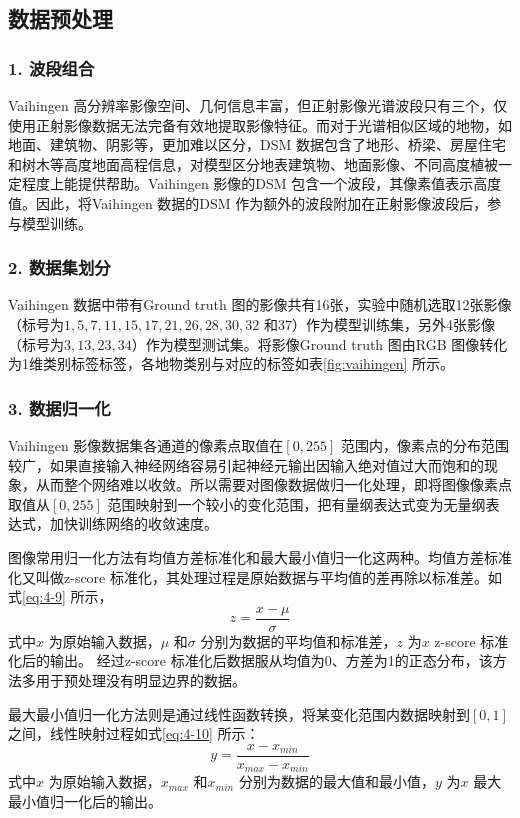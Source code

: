 \subsection{数据预处理}
\label{sec:second-2}

\subsubsection*{1. 波段组合}
Vaihingen 高分辨率影像空间、几何信息丰富，但正射影像光谱波段只有三个，仅使用正射影像数据无法完备有效地提取影像特征。而对于光谱相似区域的地物，如地面、建筑物、阴影等，更加难以区分，DSM 数据包含了地形、桥梁、房屋住宅和树木等高度地面高程信息，对模型区分地表建筑物、地面影像、不同高度植被一定程度上能提供帮助。Vaihingen 影像的DSM 包含一个波段，其像素值表示高度值。因此，将Vaihingen 数据的DSM 作为额外的波段附加在正射影像波段后，参与模型训练。

\subsubsection*{2. 数据集划分}
Vaihingen 数据中带有Ground truth 图的影像共有16张，实验中随机选取12张影像（标号为$1,5,7,11,15,17,21,26,28,30,32$ 和$37$）作为模型训练集，另外4张影像（标号为$3,13,23,34$）作为模型测试集。将影像Ground truth 图由RGB 图像转化为1维类别标签标签，各地物类别与对应的标签如表\ref{fig:vaihingen} 所示。

\subsubsection*{3. 数据归一化}
Vaihingen 影像数据集各通道的像素点取值在$[0,255]$ 范围内，像素点的分布范围较广，如果直接输入神经网络容易引起神经元输出因输入绝对值过大而饱和的现象，从而整个网络难以收敛。所以需要对图像数据做归一化处理，即将图像像素点取值从$[0,255]$ 范围映射到一个较小的变化范围，把有量纲表达式变为无量纲表达式，加快训练网络的收敛速度。

图像常用归一化方法有均值方差标准化和最大最小值归一化这两种。均值方差标准化又叫做z-score 标准化，其处理过程是原始数据与平均值的差再除以标准差。如式\ref{eq:4-9} 所示，
\begin{equation}
  \label{eq:4-9}
  z = \frac{x-\mu}{\sigma}
\end{equation}
式中$x$ 为原始输入数据，$\mu$ 和$\sigma$ 分别为数据的平均值和标准差，$z$ 为$x$ z-score 标准化后的输出。 经过z-score 标准化后数据服从均值为0、方差为1的正态分布，该方法多用于预处理没有明显边界的数据。

最大最小值归一化方法则是通过线性函数转换，将某变化范围内数据映射到$[0,1]$ 之间，线性映射过程如式\ref{eq:4-10} 所示：
\begin{equation}
  \label{eq:4-10}
  y = \frac{x-x_{min}}{x_{max}-x_{min}}
\end{equation}
式中$x$ 为原始输入数据，$x_{max}$ 和$x_{min}$ 分别为数据的最大值和最小值，$y$ 为$x$ 最大最小值归一化后的输出。


